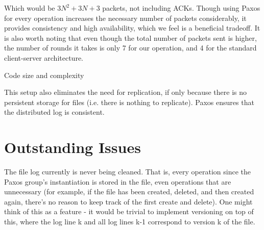 \documentclass[11pt]{article}
\begin{document}
Which would be $3N^2 + 3N + 3$ packets, not including ACKs. Though using Paxos for every operation increases the necessary number of packets considerably, it provides consistency and high availability, which we feel is a beneficial tradeoff. It is also worth noting that even though the total number of packets sent is higher, the number of rounds it takes is only 7 for our operation, and 4 for the standard client-server architecture. 


Code size and complexity

This setup also eliminates the need for replication, if only because there is no persistent storage for files (i.e. there is nothing to replicate). Paxos ensures that the distributed log is consistent.

\section{Outstanding Issues}
The file log currently is never being cleaned. That is, every operation since the Paxos group's instantiation is stored in the file, even operations that are unnecessary (for example, if the file has been created, deleted, and then created again, there's no reason to keep track of the first create and delete). One might think of this as a feature - it would be trivial to implement versioning on top of this, where the log line k and all log lines k-1 correspond to version k of the file. 
\end{document}
